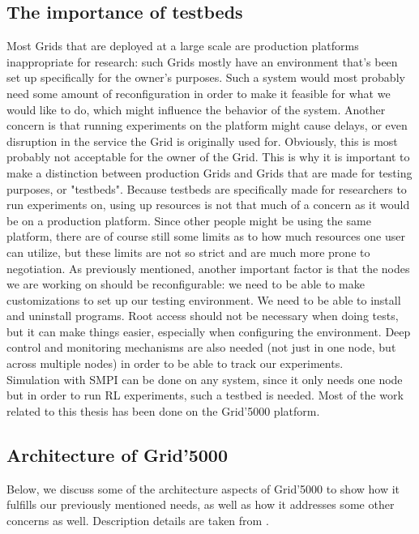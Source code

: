 \subsection{The importance of testbeds}
Most Grids that are deployed at a large scale are production platforms
inappropriate for research: such Grids mostly have an environment
that's been
set up specifically for the owner's purposes. Such a system would most
probably need some amount of reconfiguration in order to make it
feasible for what we would like to do, which might influence the
behavior of the system. Another concern is that running experiments on
the platform might cause delays, or even disruption in the
service the Grid is originally used for. Obviously, this is most
probably not acceptable for the owner of the Grid. This is why it is
important to make a distinction between production Grids and Grids
that are made for testing purposes, or "testbeds". Because testbeds
are specifically made for researchers to run experiments on, using up
resources is not that much of a concern as it would be on a production
platform. Since other people might be using the same platform, there
are of course still some limits as to how much resources one user can
utilize, but these limits are not so strict and are much more prone to
negotiation. As previously mentioned, another important factor is that
the nodes we are working on should be reconfigurable: we need to be
able to make customizations to set up our testing environment. We need
to be able to install and uninstall programs. Root access should not
be necessary when doing tests, but it can make things easier,
especially when configuring the environment. Deep control and
monitoring
mechanisms are also needed (not just in one node, but across multiple
nodes) in order to be able to track our experiments.\\
Simulation with SMPI can be done on any system, since it only needs
one node but in order to run RL experiments, such a testbed is
needed. Most of the work related to this thesis has been done on the
Grid'5000 platform.\cite{bccddjjllmmnpqrtt06}
\subsection{Architecture of Grid'5000}
Below, we discuss some of the architecture aspects of Grid'5000 to
show how it fulfills our previously mentioned needs, as well as how it
addresses some other concerns as well. Description details are taken
from \cite{bccddjjllmmnpqrtt06}.
